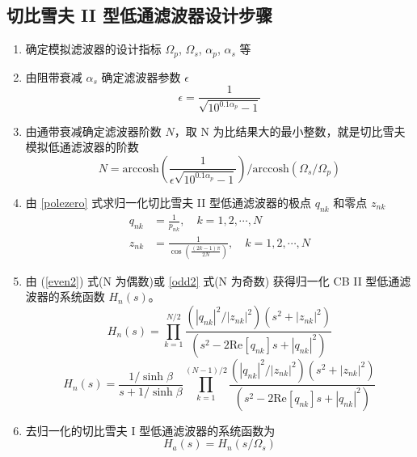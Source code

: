 \documentclass[12pt,AutoFakeBold]{article}
\begin{document}
\subsection{切比雪夫 II 型低通滤波器设计步骤}

\begin{enumerate}[1.]
\item 确定模拟滤波器的设计指标 $\Omega_p$, $\Omega_s$, $\alpha_p$, $\alpha_s$ 等

\item 由阻带衰减 $\alpha_s$ 确定滤波器参数 $\epsilon$
\begin{equation}
\epsilon=\frac{1}{\sqrt{10^{0.1\alpha_p}-1}}
\end{equation}

\item 由通带衰减确定滤波器阶数 $N$，取 N 为比结果大的最小整数，就是切比雪夫模拟低通滤波器的阶数
\begin{equation}
N=\mathrm{arccosh}\left(\frac{1}{\epsilon\sqrt{10^{0.1\alpha_p}-1}}\right)/\mathrm{arccosh}(\Omega_s/\Omega_p)
\end{equation}

\item 由 \ref{polezero} 式求归一化切比雪夫 II 型低通滤波器的极点 $q_{nk}$ 和零点 $z_{nk}$
\begin{subequations}
\label{polezero}
\begin{align}
q_{nk}&=\frac{1}{p_{nk}},\quad k=1,2,\cdots,N \\
z_{nk}&=\frac{1}{\cos\left(\frac{(2k-1)\pi}{2N}\right)},\quad k=1,2,\cdots,N
\end{align}
\end{subequations}

\item 由 (\ref{even2}) 式(N 为偶数)或 \ref{odd2} 式(N 为奇数) 获得归一化 CB II 型低通滤波器的系统函数 $H_n(s)$。
\begin{equation}
H_n(s)=\prod_{k=1}^{N/2}\frac{(|q_{nk}|^2/|z_{nk}|^2)(s^2+|z_{nk}|^2)}{(s^2-2\mathrm{Re}[q_{nk}]s+|q_{nk}|^2)} \label{even2}
\end{equation}
%
\begin{equation}
H_n(s)=\frac{1/\sinh\beta}{s+1/\sinh\beta}\prod_{k=1}^{(N-1)/2}\frac{(|q_{nk}|^2/|z_{nk}|^2)(s^2+|z_{nk}|^2)}{(s^2-2\mathrm{Re}[q_{nk}]s+|q_{nk}|^2)} \label{odd2}
\end{equation}

\item 去归一化的切比雪夫 I 型低通滤波器的系统函数为
\begin{equation}
H_a(s)=H_n(s/\Omega_s)
\end{equation}
\end{enumerate}
\end{document}
